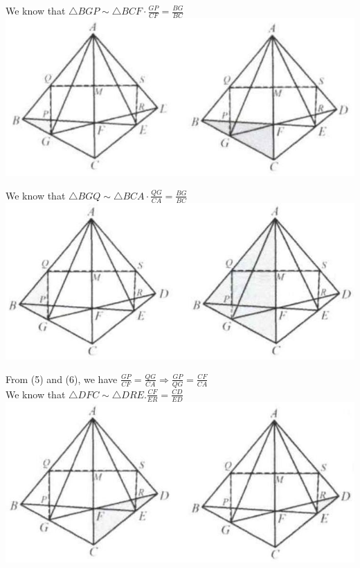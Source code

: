 \documentclass{article}
\begin{document}
We know that \(\triangle B G P \sim \triangle B C F \cdot \frac{G P}{C F}=\frac{B G}{B C}\)\\
\centering
\includegraphics[width=\textwidth]{images/143(1).jpg}


We know that \(\triangle B G Q \sim \triangle B C A \cdot \frac{Q G}{C A}=\frac{B G}{B C}\)\\
\centering
\includegraphics[width=\textwidth]{images/144(2).jpg}

From (5) and (6), we have \(\frac{G P}{C F}=\frac{Q G}{C A} \Rightarrow \frac{G P}{Q G}=\frac{C F}{C A}\)\\
We know that \(\triangle D F C \sim \triangle D R E . \frac{C F}{E R}=\frac{C D}{E D}\)\\
\centering
\includegraphics[width=\textwidth]{images/144(1).jpg}
\end{document}
